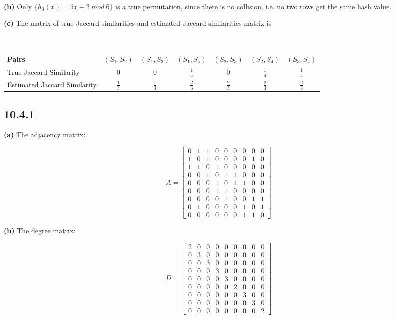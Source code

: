 \documentclass[a4paper, 11pt]{article}
\begin{document}
\

\textbf{(b)} Only $\{h_3(x) = 5x + 2 \ mod \ 6 \}$ is a true permutation, since there is no collision, i.e. no two rows get the same hash value.

\textbf{(c)} The matrix of true Jaccard similarities and estimated Jaccard similarities matrix is

\

\begin{tabular}{l|c|c|c|c|c|c} 
Pairs &  $(S_1, S_2)$ & $(S_1, S_3)$ & $(S_1, S_4)$ & $(S_2, S_3)$ & $(S_2, S_4)$ & $(S_3, S_4)$\\ 
\hline
True Jaccard Similarity & 0 & 0 & $\frac{1}{4}$ & 0 & $\frac{1}{4}$ & $\frac{1}{4}$ \\
Estimated Jaccard Similarity & $\frac{1}{3}$ & $\frac{1}{3}$  & $\frac{2}{3}$ & $\frac{2}{3}$ & $\frac{2}{3}$ & $\frac{2}{3}$ \\ 
\end{tabular} 

\subsection*{10.4.1}

\textbf{(a)} The adjacency matrix:

$$A = \begin{bmatrix}
0 &  1 & 1 & 0 & 0 & 0 & 0 & 0 & 0 \\
1 & 0 & 1 & 0 & 0 & 0 & 0 & 1 & 0 \\
1 & 1 & 0 & 1 & 0 & 0 & 0 & 0 & 0 \\
0 & 0 & 1 & 0 & 1 & 1 & 0 & 0 & 0 \\
0 & 0 & 0 & 1 & 0 & 1 & 1 & 0 & 0 \\
0 & 0 & 0 & 1 & 1 & 0 & 0 & 0 & 0 \\
0 & 0 & 0 & 0 & 1 & 0 & 0 & 1 & 1 \\
0 & 1 & 0 & 0 & 0 & 0 & 1 & 0 & 1 \\
0 & 0 & 0 & 0 & 0 & 0 & 1 & 1 & 0
\end{bmatrix}$$

\textbf{(b)} The degree matrix:

$$ D =  \begin{bmatrix}
2 & 0 & 0 & 0 & 0 & 0 & 0 & 0 & 0 \\
0 & 3 & 0 & 0 & 0 & 0 & 0 & 0 & 0 \\
0 & 0 & 3 & 0 & 0 & 0 & 0 & 0 & 0 \\
0 & 0 & 0 & 3 & 0 & 0 & 0 & 0 & 0 \\
0 & 0 & 0 & 0 & 3 & 0 & 0 & 0 & 0 \\
0 & 0 & 0 & 0 & 0 & 2 & 0 & 0 & 0 \\
0 & 0 & 0 & 0 & 0 & 0 & 3 & 0 & 0 \\
0 & 0 & 0 & 0 & 0 & 0 & 0 & 3 & 0 \\
0 & 0 & 0 & 0 & 0 & 0 & 0 & 0 & 2 
\end{bmatrix}  $$
\end{document}

